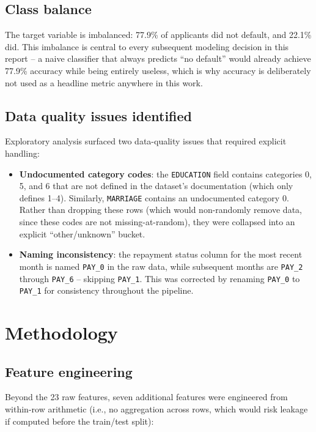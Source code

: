 \documentclass[11pt]{article}
\begin{document}
\subsection{Class balance}
The target variable is imbalanced: 77.9\% of applicants did not default,
and 22.1\% did. This imbalance is central to every subsequent modeling
decision in this report -- a naive classifier that always predicts ``no
default'' would already achieve 77.9\% accuracy while being entirely
useless, which is why accuracy is deliberately not used as a headline
metric anywhere in this work.

\subsection{Data quality issues identified}
Exploratory analysis surfaced two data-quality issues that required
explicit handling:
\begin{itemize}[nosep]
    \item \textbf{Undocumented category codes}: the \texttt{EDUCATION}
    field contains categories 0, 5, and 6 that are not defined in the
    dataset's documentation (which only defines 1--4). Similarly,
    \texttt{MARRIAGE} contains an undocumented category 0. Rather than
    dropping these rows (which would non-randomly remove data, since these
    codes are not missing-at-random), they were collapsed into an explicit
    ``other/unknown'' bucket.
    \item \textbf{Naming inconsistency}: the repayment status column for
    the most recent month is named \texttt{PAY\_0} in the raw data, while
    subsequent months are \texttt{PAY\_2} through \texttt{PAY\_6} --
    skipping \texttt{PAY\_1}. This was corrected by renaming
    \texttt{PAY\_0} to \texttt{PAY\_1} for consistency throughout the
    pipeline.
\end{itemize}

\section{Methodology}

\subsection{Feature engineering}
Beyond the 23 raw features, seven additional features were engineered
from within-row arithmetic (i.e., no aggregation across rows, which would
risk leakage if computed before the train/test split):
\end{document}
